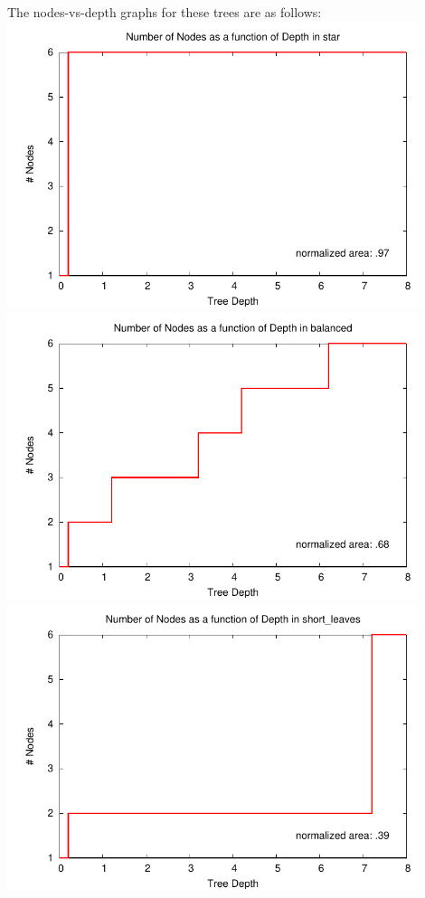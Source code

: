 The nodes-vs-depth graphs for these trees are as follows: \\
\includegraphics[width=12cm]{star.pdf} \\
\includegraphics[width=12cm]{balanced.pdf} \\
\includegraphics[width=12cm]{short_leaves.pdf} \\

